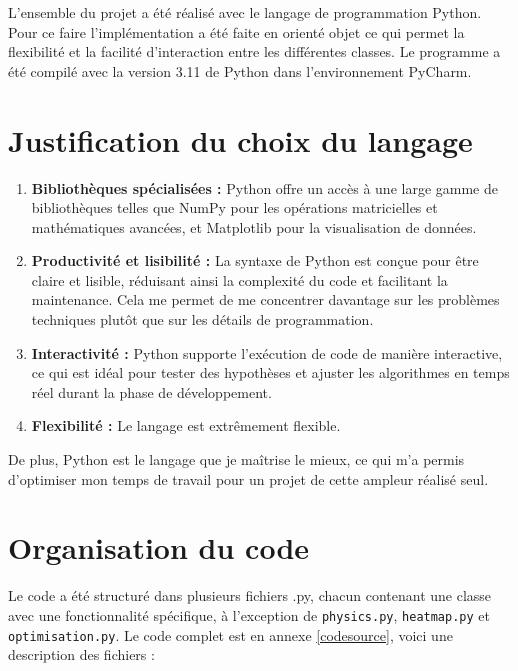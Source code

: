 L'ensemble du projet a été réalisé avec le langage de programmation Python. Pour ce faire l'implémentation a été faite en orienté objet ce qui permet la flexibilité et la facilité d'interaction entre les différentes classes. Le programme a été compilé avec la version 3.11 de Python dans l'environnement PyCharm.
\section{Justification du choix du langage}
\begin{enumerate}
    \item \textbf{Bibliothèques spécialisées :} Python offre un accès à une large gamme de bibliothèques telles que NumPy pour les opérations matricielles et mathématiques avancées, et Matplotlib pour la visualisation de données. 
    \item \textbf{Productivité et lisibilité :} La syntaxe de Python est conçue pour être claire et lisible, réduisant ainsi la complexité du code et facilitant la maintenance. Cela me permet de me concentrer davantage sur les problèmes techniques plutôt que sur les détails de programmation.
    \item \textbf{Interactivité :} Python supporte l'exécution de code de manière interactive, ce qui est idéal pour tester des hypothèses et ajuster les algorithmes en temps réel durant la phase de développement.

    \item \textbf{Flexibilité :} Le langage est extrêmement flexible.
\end{enumerate}
De plus, Python est le langage que je maîtrise le mieux, ce qui m'a permis d'optimiser mon temps de travail pour un projet de cette ampleur réalisé seul.

\section{Organisation du code}
Le code a été structuré dans plusieurs fichiers .py, chacun contenant une classe avec une fonctionnalité spécifique, à l'exception de \texttt{physics.py}, \texttt{heatmap.py} et \texttt{optimisation.py}. Le code complet est en annexe \ref{codesource}, voici une description des fichiers :

